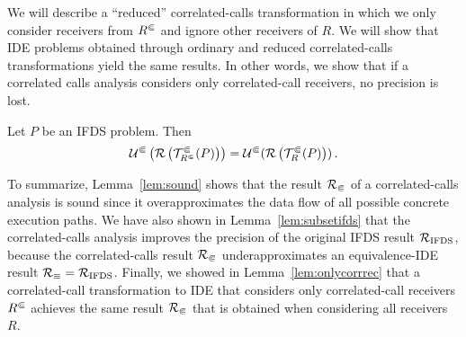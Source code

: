 We will describe a ``reduced'' correlated-calls transformation in which we only consider receivers from ${R^\Subset}$ and ignore other receivers of $R$. We will show that IDE problems obtained through ordinary and reduced correlated-calls transformations yield the same results.
In other words, we show that if a correlated calls analysis considers only correlated-call receivers, no precision is lost.

\begin{lemma}\label{lem:onlycorrrec}
  Let $P$ be an IFDS problem. Then
  \begin{equation}
    \mathcal U^\Subset\left(\mathcal R\left(\mathcal T^\Subset_{R^\Subset}(P)\right)\right)=\mathcal U^\Subset(\mathcal R\left(\mathcal T^\Subset_R(P)\right))\,.
  \end{equation}
\end{lemma}

To summarize, Lemma~\ref{lem:sound} shows that the result $\mathcal R_\Subset$ of a correlated-calls analysis is sound since it overapproximates the data flow of all possible concrete execution paths.
We have also shown in Lemma~\ref{lem:subsetifds} that the correlated-calls analysis improves the precision of the original IFDS result $\mathcal R_\text{IFDS}$, because the correlated-calls result $\mathcal R_\Subset$ underapproximates an equivalence-IDE result $\mathcal R_\equiv=\mathcal R_\text{IFDS}$.
Finally, we showed in Lemma~\ref{lem:onlycorrrec} that a correlated-call transformation to IDE that considers only correlated-call receivers ${R^\Subset}$ achieves the same result $\mathcal R_\Subset$ that is obtained when considering all receivers $R$.

